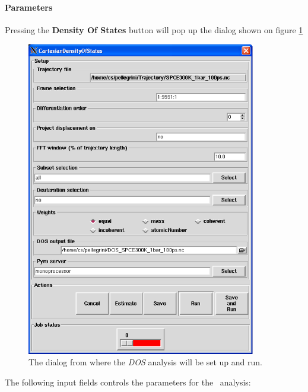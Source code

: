 \documentclass[a4paper,11pt]{report}
\begin{document}
\paragraph{Parameters\\}
\label{dos_parameters}
Pressing the \textbf{Density Of States} button will pop up the dialog shown on figure \ref{fig:dos}
\begin{figure}[h!]
\begin{center}
\includegraphics[width=10cm]{Figures/dos.eps}
\end{center}
\caption[The \textit{DOS} analysis dialog]{The dialog from where the \textit{DOS} analysis will be set up and run.}
\label{fig:dos}
\end{figure}   

The following input fields controls the parameters for the \DOS\ analysis:
\end{document}
